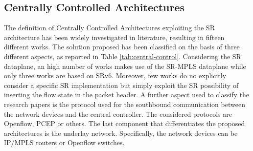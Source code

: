 \subsection{Centrally Controlled Architectures}
\label{sec:central_control}

The definition of Centrally Controlled Architectures exploiting the SR architecture has been widely investigated in literature, resulting in fifteen different works.
The solution proposed has been classified on the basis of three different aspects, as reported in Table \ref{tab:central-control}. Considering the SR dataplane, an high number of works makes use of the SR-MPLS dataplane while only three works are based on SRv6. Moreover, few works do no explicitly consider a specific SR implementation but simply exploit the SR possibility of inserting the flow state in the packet header.
A further aspect used to classify the research papers is the protocol used for the southbound communication between the network devices and the central controller.
The considered protocols are Openflow, PCEP or others.
The last component that differentiates the proposed architectures is the underlay network.
Specifically, the network devices can be IP/MPLS routers or Openflow switches.


